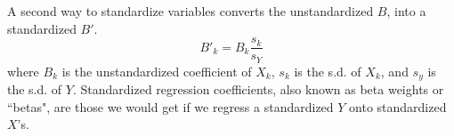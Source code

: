 \documentclass[11pt,openany]{book}
\begin{document}
A second way to standardize variables converts the unstandardized $B$, into a standardized $B'$. 
\begin{equation}
  B'_k = B_k\frac{s_k}{s_Y}  
\end{equation}
where $B_k$ is the unstandardized coefficient of $X_k$, $s_k$ is the s.d. of $X_k$, and $s_y$ is the s.d. of $Y$. Standardized regression coefficients, also known as beta weights or ``betas", are those we would get if we regress a standardized $Y$ onto standardized $X$’s. 
 
\begin{grbox}
\end{grbox}
\end{document}

